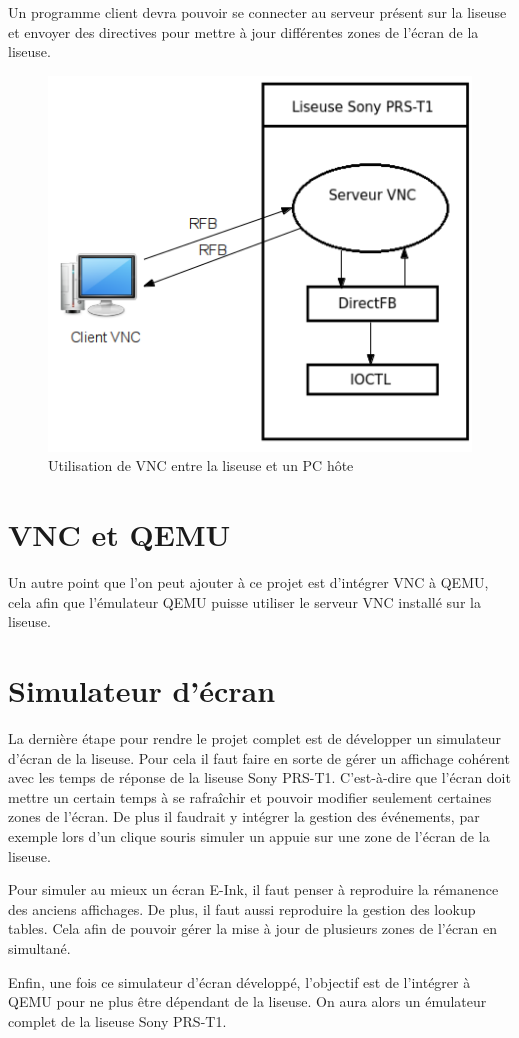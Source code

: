 Un programme client devra pouvoir se connecter au serveur présent sur la liseuse et envoyer des directives pour mettre à jour différentes zones de l'écran de la liseuse.

\begin{figure}[h!]
	\begin{center}
		\includegraphics{VNCClientServeur.png}
		\caption{Utilisation de VNC entre la liseuse et un PC hôte}
	\end{center}
\end{figure}

\section{VNC et QEMU}

Un autre point que l'on peut ajouter à ce projet est d'intégrer VNC à QEMU, cela afin que l'émulateur QEMU puisse utiliser le serveur VNC installé sur la liseuse.


\section{Simulateur d'écran}

La dernière étape pour rendre le projet complet est de développer un simulateur d'écran de la liseuse. Pour cela il faut faire en sorte de gérer un affichage cohérent avec les temps de réponse de la liseuse Sony PRS-T1. C'est-à-dire que l'écran doit mettre un certain temps à se rafraîchir et pouvoir modifier seulement certaines zones de l'écran. De plus il faudrait y intégrer la gestion des événements, par exemple lors d'un clique souris simuler un appuie sur une zone de l'écran de la liseuse.

Pour simuler au mieux un écran E-Ink, il faut penser à reproduire la rémanence des anciens affichages. De plus, il faut aussi reproduire la gestion des lookup tables. Cela afin de pouvoir gérer la mise à jour de plusieurs zones de l'écran en simultané.

Enfin, une fois ce simulateur d'écran développé, l'objectif est de l'intégrer à QEMU pour ne plus être dépendant de la liseuse. On aura alors un émulateur complet de la liseuse Sony PRS-T1.
